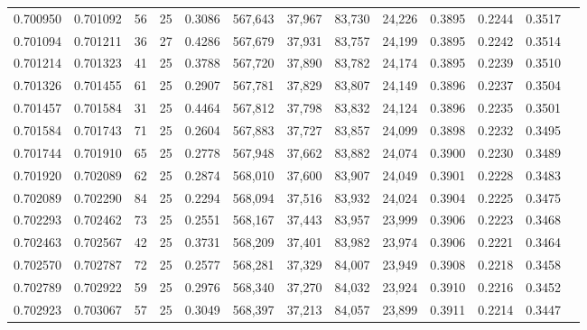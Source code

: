 \begin{tabular}{rrrrrrrrrrrrr}
0.700950 & 0.701092 &    56 &  25 &                                     0.3086 & 567,643 &  37,967 &  83,730 &  24,226 & 0.3895 & 0.2244 & 0.3517 \\
0.701094 & 0.701211 &    36 &  27 &                                     0.4286 & 567,679 &  37,931 &  83,757 &  24,199 & 0.3895 & 0.2242 & 0.3514 \\
0.701214 & 0.701323 &    41 &  25 &                                     0.3788 & 567,720 &  37,890 &  83,782 &  24,174 & 0.3895 & 0.2239 & 0.3510 \\
0.701326 & 0.701455 &    61 &  25 &                                     0.2907 & 567,781 &  37,829 &  83,807 &  24,149 & 0.3896 & 0.2237 & 0.3504 \\
0.701457 & 0.701584 &    31 &  25 &                                     0.4464 & 567,812 &  37,798 &  83,832 &  24,124 & 0.3896 & 0.2235 & 0.3501 \\
0.701584 & 0.701743 &    71 &  25 &                                     0.2604 & 567,883 &  37,727 &  83,857 &  24,099 & 0.3898 & 0.2232 & 0.3495 \\
0.701744 & 0.701910 &    65 &  25 &                                     0.2778 & 567,948 &  37,662 &  83,882 &  24,074 & 0.3900 & 0.2230 & 0.3489 \\
0.701920 & 0.702089 &    62 &  25 &                                     0.2874 & 568,010 &  37,600 &  83,907 &  24,049 & 0.3901 & 0.2228 & 0.3483 \\
0.702089 & 0.702290 &    84 &  25 &                                     0.2294 & 568,094 &  37,516 &  83,932 &  24,024 & 0.3904 & 0.2225 & 0.3475 \\
0.702293 & 0.702462 &    73 &  25 &                                     0.2551 & 568,167 &  37,443 &  83,957 &  23,999 & 0.3906 & 0.2223 & 0.3468 \\
0.702463 & 0.702567 &    42 &  25 &                                     0.3731 & 568,209 &  37,401 &  83,982 &  23,974 & 0.3906 & 0.2221 & 0.3464 \\
0.702570 & 0.702787 &    72 &  25 &                                     0.2577 & 568,281 &  37,329 &  84,007 &  23,949 & 0.3908 & 0.2218 & 0.3458 \\
0.702789 & 0.702922 &    59 &  25 &                                     0.2976 & 568,340 &  37,270 &  84,032 &  23,924 & 0.3910 & 0.2216 & 0.3452 \\
0.702923 & 0.703067 &    57 &  25 &                                     0.3049 & 568,397 &  37,213 &  84,057 &  23,899 & 0.3911 & 0.2214 & 0.3447 \\

\end{tabular}
